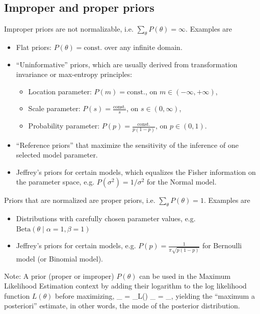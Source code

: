 \subsection{Improper and proper priors}
\no Improper priors are not normalizable, i.e. $\sum_\theta P(\theta) = \infty$. Examples are
\begin{itemize}
	\item Flat priors: $P(\theta) = \text{const.}$ over any infinite domain.
	\item ``Uninformative'' priors, which are usually derived from transformation invariance or max-entropy principles:
	\begin{itemize}
		\item Location parameter: $P(m) = \text{const.}$, on $m \in (-\infty, +\infty)$,
		\item Scale parameter: $P(s) = \frac{\text{const.}}{s}$, on $s\in (0, \infty)$,
		\item Probability parameter: $P(p) = \frac{\text{const.}}{p(1-p)}$, on $p\in(0,1)$.
	\end{itemize}
	\item ``Reference priors'' that maximize the sensitivity of the inference of one selected model parameter.
	\item Jeffrey's priors for certain models, which equalizes the Fisher information on the parameter space, e.g. $P(\sigma^2) = 1 / \sigma^2$ for the Normal model.
\end{itemize}
Priors that are normalized are proper priors, i.e. $\sum_\theta P(\theta) = 1$. Examples are
\begin{itemize}
	\item Distributions with carefully chosen parameter values, e.g. $\text{Beta}(\theta\;|\;\alpha = 1,\beta = 1)$
	\item Jeffrey's priors for certain models, e.g. $P(p) = \frac{1}{\pi\sqrt{p (1-p)}}$ for Bernoulli model (or Binomial model).
\end{itemize}
Note: A prior (proper or improper) $P(\theta)$ can be used in the Maximum Likelihood Estimation context by adding their logarithm to the log likelihood function $L(\theta)$ before maximizing,
\be
	\theta_ = \amax_\theta L(\theta)
	\qquad \rightarrow \qquad
	\theta_ = \amax_\theta {},
\ee
yielding the ``maximum a posteriori'' estimate, in other words, the mode of the posterior distribution.

